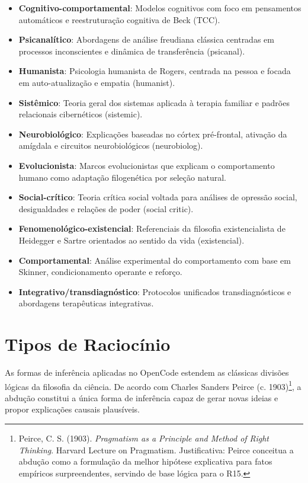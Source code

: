 \documentclass[12pt,a4paper,oneside]{abntex2}
\begin{document}
\begin{apendicesenv}
\begin{itemize}
    \item \textbf{Cognitivo-comportamental}: Modelos cognitivos com foco em pensamentos automáticos e reestruturação cognitiva de Beck (TCC).

    \item \textbf{Psicanalítico}: Abordagens de análise freudiana clássica centradas em processos inconscientes e dinâmica de transferência (psicanal).

    \item \textbf{Humanista}: Psicologia humanista de Rogers, centrada na pessoa e focada em auto-atualização e empatia (humanist).

    \item \textbf{Sistêmico}: Teoria geral dos sistemas aplicada à terapia familiar e padrões relacionais cibernéticos (sistemic).

    \item \textbf{Neurobiológico}: Explicações baseadas no córtex pré-frontal, ativação da amígdala e circuitos neurobiológicos (neurobiolog).

    \item \textbf{Evolucionista}: Marcos evolucionistas que explicam o comportamento humano como adaptação filogenética por seleção natural.

    \item \textbf{Social-crítico}: Teoria crítica social voltada para análises de opressão social, desigualdades e relações de poder (social critic).

    \item \textbf{Fenomenológico-existencial}: Referenciais da filosofia existencialista de Heidegger e Sartre orientados ao sentido da vida (existencial).

    \item \textbf{Comportamental}: Análise experimental do comportamento com base em Skinner, condicionamento operante e reforço.

    \item \textbf{Integrativo/transdiagnóstico}: Protocolos unificados transdiagnósticos e abordagens terapêuticas integrativas.
\end{itemize}

\section{Tipos de Raciocínio}

As formas de inferência aplicadas no OpenCode estendem as clássicas divisões lógicas da filosofia da ciência. De acordo com Charles Sanders Peirce (c. 1903)\footnote{Peirce, C. S. (1903). \textit{Pragmatism as a Principle and Method of Right Thinking}. Harvard Lecture on Pragmatism. Justificativa: Peirce conceitua a abdução como a formulação da melhor hipótese explicativa para fatos empíricos surpreendentes, servindo de base lógica para o R15.}, a abdução constitui a única forma de inferência capaz de gerar novas ideias e propor explicações causais plausíveis.


\end{apendicesenv}
\end{document}
